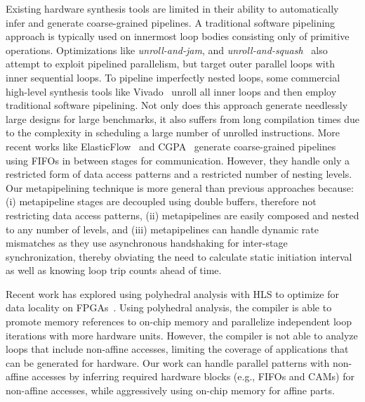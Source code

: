 Existing hardware synthesis tools are limited in their
ability to automatically infer and generate coarse-grained pipelines. A traditional
software pipelining approach is typically used on innermost loop bodies consisting
only of primitive operations. Optimizations like \emph{unroll-and-jam}, and \emph{unroll-and-squash}~\cite{unrollSquash}
also attempt to exploit pipelined parallelism, but target outer parallel loops
with inner sequential loops. To pipeline imperfectly nested loops, some
commercial high-level synthesis tools like Vivado~\cite{vivadohls} unroll all inner loops and then employ traditional
software pipelining. Not only does this approach generate needlessly large designs for large benchmarks,
it also suffers from long compilation times due to the complexity in scheduling a large number of unrolled instructions.
More recent works like ElasticFlow~\cite{elasticFlow} and CGPA~\cite{cgpa} generate coarse-grained
pipelines using FIFOs in between stages for communication. However, they handle only a restricted form of data access
patterns and a restricted number of nesting levels. Our metapipelining technique is more general than previous approaches because:
(i) metapipeline stages are decoupled using double buffers, therefore not restricting data access patterns, (ii) metapipelines
are easily composed and nested to any number of levels, and (iii) metapipelines can handle
dynamic rate mismatches as they use asynchronous handshaking for inter-stage synchronization, thereby obviating the need
to calculate static initiation interval as well as knowing loop trip counts ahead of time.


Recent work has explored using polyhedral analysis with HLS to optimize for data
locality on FPGAs~\cite{pouchet13fpga}.  Using polyhedral analysis, the compiler
is able to promote memory references to on-chip memory and parallelize
independent loop iterations with more hardware units.  However, the compiler is
not able to analyze loops that include non-affine accesses, limiting the
coverage of applications that can be generated for hardware. Our work can
handle parallel patterns with non-affine accesses by inferring required
hardware blocks (e.g., FIFOs and CAMs) for non-affine accesses, while
aggressively using on-chip memory for affine parts.

